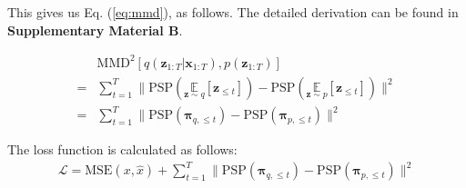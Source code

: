 \documentclass[letterpaper]{article} %
\begin{document}
This gives us Eq. (\ref{eq:mmd}), as follows. The detailed derivation can be found in \textbf{Supplementary Material B}.

\begin{align}
    &\mathrm{MMD}^2[q(\bm{z}_{1:T}|\bm{x}_{1:T}),p(\bm{z}_{1:T})]\nonumber\\
    =& \sum_{t=1}^T \| \mathrm{PSP}(\underset{\bm{z}\sim q}{\mathbb{E}}[\bm{z}_{\leq t}]) - \mathrm{PSP}(\underset{\bm{z}\sim p}{\mathbb{E}}[\bm{z}_{\leq t}]) \|^2 \\
    =& \sum_{t=1}^T \| \mathrm{PSP}(\bm{\pi}_{q,\leq t}) - \mathrm{PSP}(\bm{\pi}_{p,\leq t})\|^2
\end{align}

The loss function is calculated as follows:
\begin{align}
    \mathcal{L} = \mathrm{MSE}(x,\hat{x}) + \sum_{t=1}^T \| \mathrm{PSP}(\bm{\pi}_{q,\leq t}) - \mathrm{PSP}(\bm{\pi}_{p,\leq t})\|^2 \label{eq:lossmmd}
\end{align}
\end{document}
